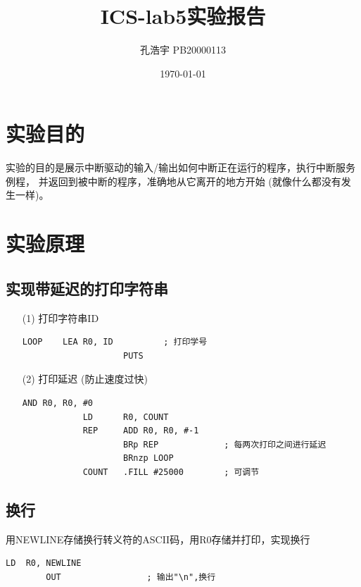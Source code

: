 \documentclass[UTF8]{ctexart}
\title{ICS-lab5实验报告}
\author{孔浩宇 PB20000113}
\date{\today}
\begin{document}
\fancyfoot[C]{\thepage}

\maketitle
\tableofcontents
\newpage

\section{实验目的}
    实验的目的是展示中断驱动的输入/输出如何中断正在运行的程序，执行中断服务例程，
    并返回到被中断的程序，准确地从它离开的地方开始 (就像什么都没有发生一样)。

\section{实验原理}
    \subsection{实现带延迟的打印字符串}
    \begin{enumerate}
        \item [(1)]打印字符串ID
        \begin{lstlisting}[basicstyle=\ttfamily,language={[x86masm]Assembler}]
            LOOP    LEA R0, ID          ; 打印学号
                    PUTS             
        \end{lstlisting}

        \item [(2)]打印延迟 (防止速度过快)
        \begin{lstlisting}[basicstyle=\ttfamily,language={[x86masm]Assembler}]
                    AND R0, R0, #0
            LD      R0, COUNT
            REP     ADD R0, R0, #-1
                    BRp REP             ; 每两次打印之间进行延迟
                    BRnzp LOOP
            COUNT   .FILL #25000        ; 可调节         
        \end{lstlisting}
    \end{enumerate}

    \subsection{换行}
    用NEWLINE存储换行转义符的ASCII码，用R0存储并打印，实现换行
    \begin{lstlisting}[basicstyle=\ttfamily,language={[x86masm]Assembler}]
        LD  R0, NEWLINE     
        OUT                 ; 输出"\n",换行
    \end{lstlisting}
\end{document}

